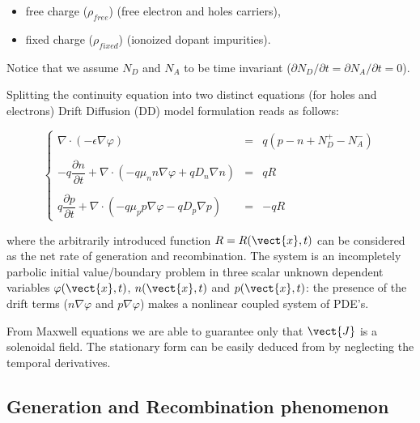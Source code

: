 \begin{itemize}
\item free charge ($\rho_{free}$) (free electron and holes carriers),
\item fixed charge ($\rho_{fixed}$) (ionoized dopant impurities).
\end{itemize} 


 Notice that we assume $N_D$ and $N_A$ to be time invariant ($\partial N_D / \partial t=\partial N_A / \partial t = 0$).

 Splitting the continuity equation  into two distinct equations (for holes and electrons) Drift Diffusion (DD) model formulation reads as follows:
  
\begin{equation}
\label{eq: full problem}
\left\{
\begin{array}{rcl}
\nabla \cdot (-\epsilon \nabla \varphi) & = & q(p-n+N_D^+-N_A^-)\\ \\
-q\dfrac{\partial n}{\partial t} + \nabla \cdot ( - q\mu_n n \nabla \varphi + qD_n \nabla n )& = & qR\\ \\
q\dfrac{\partial p}{\partial t} + \nabla \cdot (- q\mu_p p \nabla \varphi - qD_p \nabla p )& = & -qR 
\end{array}
\right.
\end{equation}

where the arbitrarily introduced function $R=R(\vect{x},t)$ can be considered as the net rate of generation and recombination.
The system is an incompletely parbolic initial value/boundary problem in three scalar unknown dependent variables $\varphi(\vect{x},t)$, $n(\vect{x},t)$ and $p(\vect{x},t)$: the presence of the drift terms ($n\nabla \varphi$ and $p \nabla 	\varphi$) makes  a nonlinear coupled system of PDE's. 

From Maxwell equations we are able to guarantee only that $\vect{J}$ is a solenoidal field.
The stationary form can be easily deduced from  by neglecting the temporal derivatives.





\subsection{Generation and Recombination phenomenon}
\label{subsection: RG}

